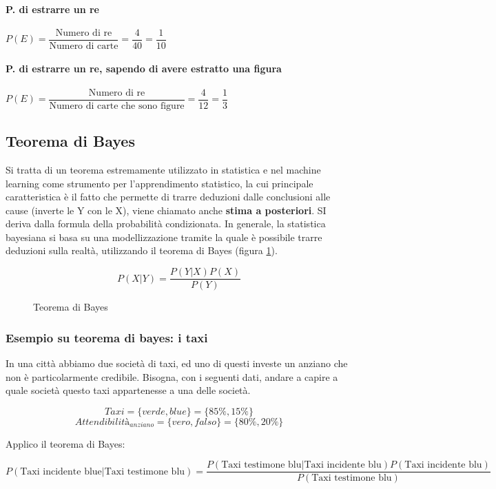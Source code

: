 \documentclass[\main/main.tex]{subfiles}
\begin{document}
\paragraph{P. di estrarre un re} $P(E) = \dfrac{\text{Numero di re}}{\text{Numero di carte}} = \dfrac{4}{40} = \dfrac{1}{10}$
\paragraph{P. di estrarre un re, sapendo di avere estratto una figura} $P(E) = \dfrac{\text{Numero di re}}{\text{Numero di carte che sono figure}} = \dfrac{4}{12} = \dfrac{1}{3}$

\subsection{Teorema di Bayes}
Si tratta di un teorema estremamente utilizzato in statistica e nel machine learning come strumento per l'apprendimento statistico, la cui principale caratteristica è il fatto che permette di trarre deduzioni dalle conclusioni alle cause (inverte le Y con le X), viene chiamato anche \textbf{stima a posteriori}. SI deriva dalla formula della probabilità condizionata. In generale, la statistica bayesiana si basa su una modellizzazione tramite la quale è possibile trarre deduzioni sulla realtà, utilizzando il teorema di Bayes (figura \ref{teorBayes}).

\begin{figure}[H]
\[
	P(X|Y) = \dfrac{P(Y|X)P(X)}{P(Y)}
\]
\caption{Teorema di Bayes}
\label{teorBayes}
\end{figure}

\subsubsection{Esempio su teorema di bayes: i taxi}
In una città abbiamo due società di taxi, ed uno di questi investe un anziano che non è particolarmente credibile. Bisogna, con i seguenti dati, andare a capire a quale società questo taxi appartenesse a una delle società.

\[
	Taxi = \{ verde, blue \} = \{85\%, 15\%\}
\]
\[
	Attendibilità_{anziano} = \{vero, falso\} = \{80\%, 20\%\}
\]

Applico il teorema di Bayes:

\[
	P(\text{Taxi incidente blue} | \text{Taxi testimone blu}) = \dfrac{P(\text{Taxi testimone blu}| \text{Taxi incidente blu})P(\text{Taxi incidente blu})}{P(\text{Taxi testimone blu})}
\]
\end{document}
